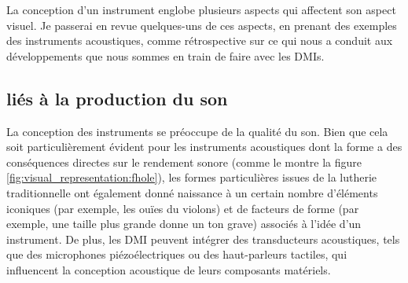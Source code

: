 La conception d'un instrument englobe plusieurs aspects qui affectent son aspect visuel. Je passerai en revue quelques-uns de ces aspects, en prenant des exemples des instruments acoustiques, comme rétrospective sur ce qui nous a conduit aux développements que nous sommes en train de faire avec les \glspl{DMI}.

\subsection{liés à la production du son}

La conception des instruments se préoccupe de la qualité du son. Bien que cela soit particulièrement évident pour les instruments acoustiques dont la forme a des conséquences directes sur le rendement sonore (comme le montre la figure \ref{fig:visual_representation:fhole}), les formes particulières issues de la lutherie traditionnelle ont également donné naissance à un certain nombre d'éléments iconiques (par exemple, les ouïes du violons) et de facteurs de forme (par exemple, une taille plus grande donne un ton grave) associés à l'idée d'un instrument. De plus, les DMI peuvent intégrer des transducteurs acoustiques, tels que des microphones piézoélectriques ou des haut-parleurs tactiles, qui influencent la conception acoustique de leurs composants matériels.


